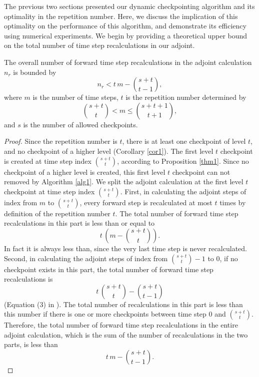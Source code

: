 \documentclass[oneeqnum, onethmnum, onefignum, onetabnum]{siamltex}
\begin{document}
The previous two sections presented our dynamic checkpointing algorithm and
its optimality in the repetition number.  Here, we discuss the implication
of this optimality on the performance of this algorithm, and demonstrate its
efficiency using numerical experiments.  We begin by providing a theoretical
upper bound on the total number of time step recalculations in our adjoint.

\begin{proposition}
The overall number of forward time step recalculations in the adjoint
calculation $n_r$ is bounded by
\begin{equation} \label{ubound}
n_r < t\, m - \binom{s + t}{t - 1},
\end{equation}
where $m$ is the number of time steps, $t$ is the repetition number
determined by
\[ \binom{s + t}{t} < m \le \binom{s + t+1}{t+1}, \]
and $s$ is the number of allowed checkpoints.
\end{proposition}
\begin{proof}
Since the repetition number is $t$, there is at least one checkpoint of
level $t$, and no checkpoint of a higher level (Corollary \ref{cor1}).  The
first level $t$
checkpoint is created at time step index $\binom{s + t}{t}$,
according to Proposition \ref{thm1}.  Since no checkpoint of a higher level
is created, this first level $t$ checkpoint can not removed by Algorithm
\ref{alg1}.  We split the adjoint calculation at the first level $t$
checkpoint at time step index $\binom{s + t}{t}$.  First, in
calculating the adjoint steps of index from $m$ to
$\binom{s + t}{t}$, every forward step is recalculated at most
$t$ times by definition of the repetition number $t$.  The total number
of forward time step recalculations in this part is less than or equal to
\[t\, \left(m - \binom{s + t}{t}\right).\]  In fact it is always
less than, since the very last time step is never recalculated.
Second, in calculating the adjoint steps of index from
$\binom{s + t}{t} - 1$ to $0$, if no checkpoint exists in this part,
the total number of forward time step recalculations is
\[ t\, \binom{s + t}{t} - \binom{s + t}{t - 1} \]
(Equation (3) in \cite{griewank00}).
The total number of recalculations in this part is less than this number
if there is one or more checkpoints between time step $0$ and
$\binom{s + t}{t}$.  Therefore, the total number of forward time
step recalculations in the entire adjoint calculation, which is the sum of
the number of recalculations in the two parts, is less than
\[ t\, m - \binom{s + t}{t - 1}. \]
\end{proof}
\end{document}
